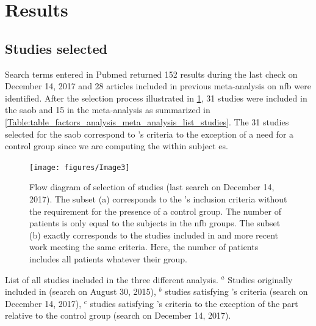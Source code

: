 


\section{Results}

\subsection{Studies selected}

Search terms entered in Pubmed returned 152 results during the last check on December 14, 2017 and 28 articles included in previous
meta-analysis on \gls{nfb} were identified. After the selection process illustrated in \cref{Figure:systematic_review_workflow}, 
31 studies were included in the \gls{saob} and 15 in the meta-analysis as summarized in \cref{Table:table_factors_analysis_meta_analysis_list_studies}.
The 31 studies selected for the \gls{saob} correspond to \citeauthor{Cortese2016}'s criteria to the exception of a need for a control group since 
we are computing the within subject \gls{es}.  

\begin{figure}[h!]
  \centering
	\texttt{[image: figures/Image3]} 
  \caption{Flow diagram of selection of studies (last search on December 14, 2017).  
	The subset (a) corresponds to the \citeauthor{Cortese2016}'s inclusion criteria without the requirement for the presence of a control group. The number
	of patients is only equal to the subjects in the \gls{nfb} groups.
	The subset (b) exactly corresponds to the studies included in \citet{Cortese2016} and more recent work meeting the same criteria. Here, the number of patients includes all patients
	whatever their group.}
  \label{Figure:systematic_review_workflow}
\end{figure}

\begin{table}[h!]
  \centering
  \caption{List of all studies included in the three different analysis. $^a$ Studies originally included in \citet{Cortese2016}
	(search on August 30, 2015), $^b$ studies satisfying \citet{Cortese2016}'s criteria (search on December 14, 2017), $^c$ studies 
	satisfying \citet{Cortese2016}'s criteria to the exception of the part relative to the control group (search on December 14, 2017).}
  
  \label{Table:table_factors_analysis_meta_analysis_list_studies}
\end{table}

